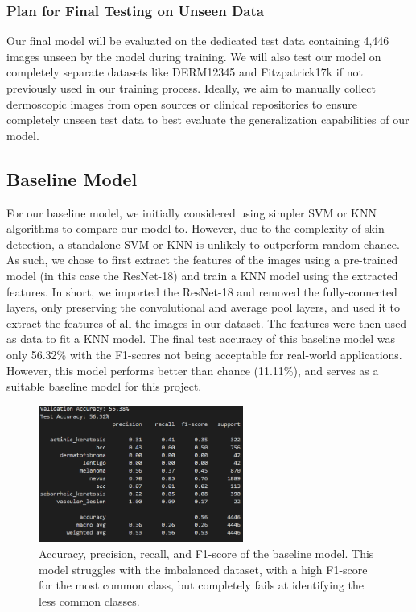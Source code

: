 \documentclass{article} %
\begin{document}
\subsubsection{Plan for Final Testing on Unseen Data}

Our final model will be evaluated on the dedicated test data containing 4,446 images unseen by the model during training. We will also test our model on completely separate datasets like DERM12345 and Fitzpatrick17k if not previously used in our training process. Ideally, we aim to manually collect dermoscopic images from open sources or clinical repositories to ensure completely unseen test data to best evaluate the generalization capabilities of our model.

\subsection{Baseline Model}

For our baseline model, we initially considered using simpler SVM or KNN algorithms to compare our model to. However, due to the complexity of skin detection, a standalone SVM or KNN is unlikely to outperform random chance. As such, we chose to first extract the features of the images using a pre-trained model (in this case the ResNet-18) and train a KNN model using the extracted features. In short, we imported the ResNet-18 and removed the fully-connected layers, only preserving the convolutional and average pool layers, and used it to extract the features of all the images in our dataset. The features were then used as data to fit a KNN model. The final test accuracy of this baseline model was only 56.32\% with the F1-scores not being acceptable for real-world applications. However, this model performs better than chance (11.11\%), and serves as a suitable baseline model for this project.

\begin{figure}[h]
\begin{center}
\includegraphics[width=0.6\textwidth]{Figs/baseline_performance.png}
\end{center}
\caption{Accuracy, precision, recall, and F1-score of the baseline model. This model struggles with the imbalanced dataset, with a high F1-score for the most common class, but completely fails at identifying the less common classes.}
\end{figure}
\end{document}
